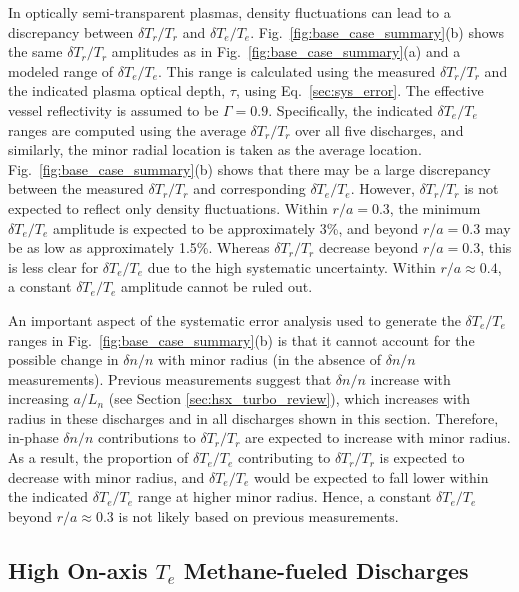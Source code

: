 \documentclass[%
 aip,
 amsmath,amssymb,
 reprint,%
]{revtex4-1}
\begin{document}
In optically semi-transparent plasmas, density fluctuations can lead to a discrepancy between $\delta T_r/T_r$ and $\delta T_e/T_e$. Fig.\ \ref{fig:base_case_summary}(b) shows the same $\delta T_r/T_r$ amplitudes as in Fig.\ \ref{fig:base_case_summary}(a) and a modeled range of $\delta T_e/T_e$. This range is calculated using the measured $\delta T_r/T_r$ and the indicated plasma optical depth, $\tau$, using Eq.\ \eqref{sec:sys_error}. The effective vessel reflectivity is assumed to be $\Gamma=0.9$. Specifically, the indicated $\delta T_e/T_e$ ranges are computed using the average $\delta T_r/T_r$ over all five discharges, and similarly, the minor radial location is taken as the average location. Fig.\ \ref{fig:base_case_summary}(b) shows that there may be a large discrepancy between the measured $\delta T_r/T_r$ and corresponding $\delta T_e/T_e$. However, $\delta T_r/T_r$ is not expected to reflect only density fluctuations. Within $r/a=0.3$, the minimum $\delta T_e/T_e$  amplitude is expected to be approximately 3\%, and beyond $r/a=0.3$ may be as low as approximately 1.5\%. Whereas $\delta T_r/T_r$ decrease beyond $r/a=0.3$, this is less clear for $\delta T_e/T_e$  due to the high systematic uncertainty. Within $r/a\approx0.4$, a constant $\delta T_e/T_e$ amplitude cannot be ruled out.

An important aspect of the systematic error analysis used to generate the $\delta T_e/T_e$ ranges in Fig.\ \ref{fig:base_case_summary}(b) is that it cannot account for the possible change in $\delta n/n$ with minor radius (in the absence of $\delta n/n$ measurements). Previous measurements suggest that $\delta n/n$ increase with increasing $a/L_n$ (see Section \ref{sec:hsx_turbo_review}), which increases with radius in these discharges and in all discharges shown in this section. Therefore, in-phase $\delta n/n$ contributions to $\delta T_r/T_r$ are expected to increase with minor radius. As a result, the proportion of $\delta T_e/T_e$ contributing to $\delta T_r/T_r$  is expected to decrease with minor radius, and $\delta T_e/T_e$  would be expected to fall lower within the indicated $\delta T_e/T_e$ range at higher minor radius. Hence, a constant $\delta T_e/T_e$ beyond $r/a\approx0.3$ is not likely based on previous measurements.


\subsection{High On-axis $T_e$ Methane-fueled Discharges} \label{sec:methane_flucs}
\end{document}

